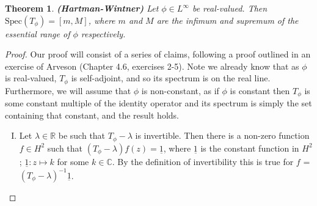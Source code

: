 \documentclass{article}
\newtheorem{theorem}{Theorem}
\newcommand{\Spec}{\text{Spec}}
\begin{document}
\begin{theorem}{\textbf{(Hartman-Wintner)}}
Let $\phi \in L^\infty$ be real-valued. Then $\Spec(T_\phi) = [m, M]$, where $m$ and $M$ are the infimum and supremum of the essential range of $\phi$ respectively.
\end{theorem}
\begin{proof}
Our proof will consist of a series of claims, following a proof outlined in an exercise of Arveson \parencite{arveson2002short} (Chapter 4.6, exercises 2-5). 
Note we already know that as $\phi$ is real-valued, $T_\phi$ is self-adjoint, and so its spectrum is on the real line. 
Furthermore, we will assume that $\phi$ is non-constant, as if $\phi$ is constant then $T_\phi$ is some constant multiple of the identity operator
and its spectrum is simply the set containing that constant, and the result holds.
\begin{enumerate}[I.]
\item Let $\lambda \in \mathbb{R}$ be such that $T_\phi - \lambda$ is invertible. Then there is a non-zero function $f \in H^2$ such that $(T_\phi - \lambda)f(z) = \underline{1}$, where
$\underline{1}$ is the constant function in $H^2$; $\underline{1} : z \mapsto k$ for some $k \in \mathbb{C}.$ By the definition of invertibility this is true for $f$ = $(T_\phi - \lambda)^{-1}\underline{1}$.


\end{enumerate}
\end{proof}
\end{document}
